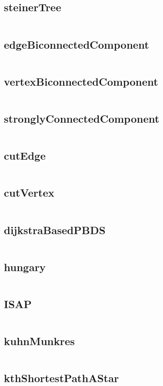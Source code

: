   \subsection{steinerTree}
    \inputminted{cpp}{../code/graph/steinerTree.cpp}
  \subsection{edgeBiconnectedComponent}
    \inputminted{cpp}{../code/graph/edgeBiconnectedComponent.cpp}
  \subsection{vertexBiconnectedComponent}
    \inputminted{cpp}{../code/graph/vertexBiconnectedComponent.cpp}
  \subsection{stronglyConnectedComponent}
    \inputminted{cpp}{../code/graph/stronglyConnectedComponent.cpp}
  \subsection{cutEdge}
    \inputminted{cpp}{../code/graph/cutEdge.cpp}
  \subsection{cutVertex}
    \inputminted{cpp}{../code/graph/cutVertex.cpp}
  \subsection{dijkstraBasedPBDS}
    \inputminted{cpp}{../code/graph/dijkstraBasedPBDS.cpp}
  \subsection{hungary}
    \inputminted{cpp}{../code/graph/hungary.cpp}
  \subsection{ISAP}
    \inputminted{cpp}{../code/graph/ISAP.cpp}
  \subsection{kuhnMunkres}
    \inputminted{cpp}{../code/graph/kuhnMunkres.cpp}
  \subsection{kthShortestPathAStar}
    \inputminted{cpp}{../code/graph/kthShortestPathAStar.cpp}

